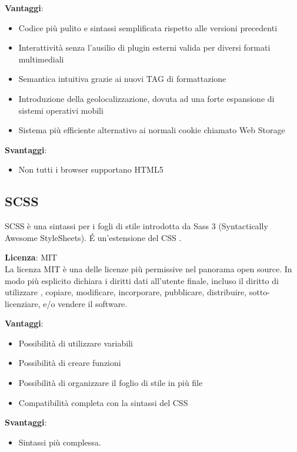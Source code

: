 \textbf{Vantaggi}: 
\begin{itemize}
	\item Codice più pulito e sintassi semplificata rispetto alle versioni precedenti
	\item Interattività senza l’ausilio di plugin esterni valida per diversi formati multimediali
	\item Semantica intuitiva grazie ai nuovi TAG di formattazione
	\item Introduzione della geolocalizzazione, dovuta ad una forte espansione di sistemi operativi mobili
	\item Sistema più efficiente alternativo ai normali cookie chiamato Web Storage 

\end{itemize}

\textbf{Svantaggi}: 
\begin{itemize}
	\item Non tutti i browser supportano HTML5
\end{itemize}

\subsection{SCSS}

SCSS è una sintassi per i fogli di stile introdotta da Sass 3 (Syntactically Awesome StyleSheets). \'E un'estensione del CSS .

\textbf{Licenza}: MIT \\
La licenza MIT è una delle licenze più permissive nel panorama open source. In modo più esplicito dichiara i diritti dati all'utente finale, incluso il diritto di utilizzare , copiare, modificare, incorporare, pubblicare, distribuire, sotto-licenziare, e/o vendere il software.

\textbf{Vantaggi}: 
\begin{itemize}
	\item Possibilità di utilizzare variabili
	\item Possibilità di creare funzioni 
	\item Possibilità di organizzare il foglio di stile in più file
	\item Compatibilità completa con la sintassi del CSS
\end{itemize}

\textbf{Svantaggi}: 
\begin{itemize}
	\item  Sintassi più complessa.
\end{itemize}

